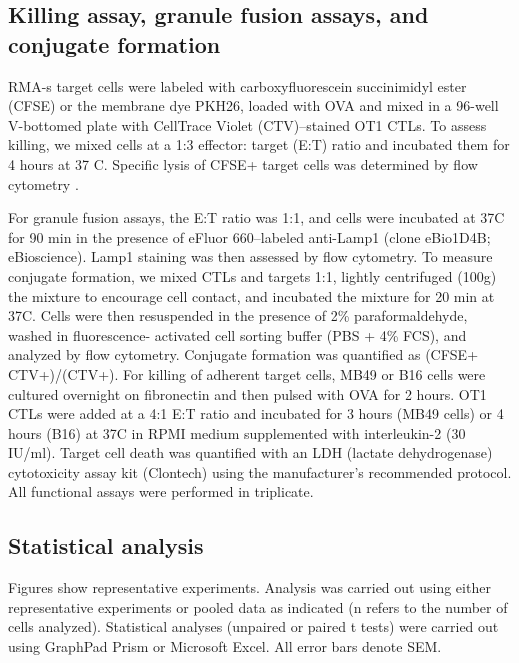 \subsection{Killing assay, granule fusion assays, and conjugate formation}
RMA-s target cells were labeled with carboxyfluorescein succinimidyl ester (CFSE) or the membrane dye PKH26, loaded with OVA and mixed in a 96-well V-bottomed plate with CellTrace Violet (CTV)–stained OT1 CTLs. To assess killing, we mixed cells at a 1:3 effector: target (E:T) ratio and incubated them for 4 hours at 37 \degree C. Specific lysis of CFSE+ target cells was determined by flow cytometry \cite{Purbhoo2004}.

For granule fusion assays, the E:T ratio was 1:1, and cells were incubated at 37\degree C for 90 min in the presence of eFluor 660–labeled anti-Lamp1 (clone eBio1D4B; eBioscience). Lamp1 staining was then assessed by flow cytometry. To measure conjugate formation, we mixed CTLs and targets 1:1, lightly centrifuged (100g) the mixture to encourage cell contact, and incubated the mixture for 20 min at 37\degree C. Cells were then resuspended in the presence of 2\% paraformaldehyde, washed in fluorescence- activated cell sorting buffer (PBS + 4\% FCS), and analyzed by flow cytometry. Conjugate formation was quantified as (CFSE+ CTV+)/(CTV+). For killing of adherent target cells, MB49 or B16 cells were cultured overnight on fibronectin and then pulsed with OVA for 2 hours. OT1 CTLs were added at a 4:1 E:T ratio and incubated for 3 hours (MB49 cells) or 4 hours (B16) at 37\degree C in RPMI medium supplemented with interleukin-2 (30 IU/ml). Target cell death was quantified with an LDH (lactate dehydrogenase) cytotoxicity assay kit (Clontech) using the manufacturer’s recommended protocol. All functional assays were performed in triplicate.

\subsection{Statistical analysis}
Figures show representative experiments. Analysis was carried out using either representative experiments or pooled data as indicated (n refers to the number of cells analyzed). Statistical analyses (unpaired or paired t tests) were carried out using GraphPad Prism or Microsoft Excel. All error bars denote SEM.

